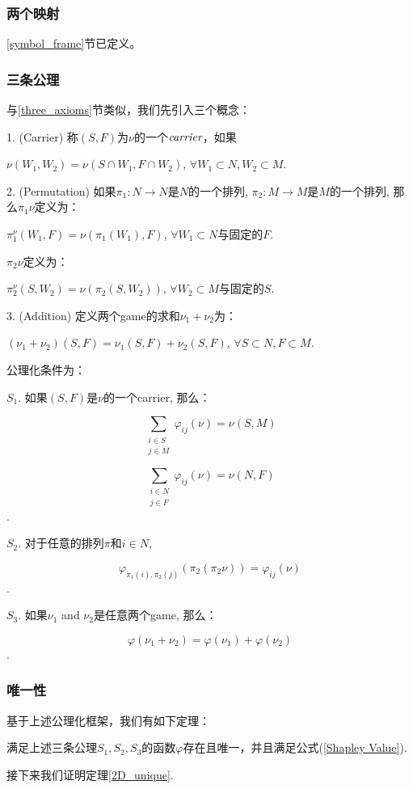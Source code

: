 \subsubsection{两个映射}
\ref{symbol_frame}节已定义。

\subsubsection{三条公理}
与\ref{three_axioms}节类似，我们先引入三个概念：

1. (Carrier) 称$(S,F)$为$\nu$的一个$\emph{carrier}$，如果

$\nu(W_1, W_2)=\nu(S\cap W_1, F\cap W_2)$,  $\forall W_1 \subset N, W_2 \subset M$. 


2. (Permutation) 如果$\pi_1: N\rightarrow N$是$N$的一个排列, $\pi_2: M\rightarrow M$是$M$的一个排列, 那么$\pi_1\nu$定义为：

$\pi_1^\nu(W_1, F) = \nu(\pi_1(W_1), F)$, $\forall W_1 \subset N$与固定的$F$.

$\pi_2\nu$定义为： 

$\pi_2^\nu(S, W_2) = \nu(\pi_2(S, W_2))$, $\forall W_2 \subset M$与固定的$S$.

3. (Addition) 定义两个game的求和$\nu_1+\nu_2$为：

$(\nu_1+\nu_2)(S, F) = \nu_1(S, F)+\nu_2(S, F)$, $\forall S \subset N, F \subset M$.

公理化条件为：

$S_1$. 如果$(S,F)$是$\nu$的一个carrier, 那么： 

$$\sum_{\substack{i \in S\\j \in M}} \varphi_{ij}(\nu) = \nu(S, M)$$

$$\sum_{\substack{i \in N\\j \in F}} \varphi_{ij}(\nu) = \nu(N, F)$$.


$S_2$. 对于任意的排列$\pi$和$i \in N$,

$$\varphi_{\pi_1(i), \pi_2(j)}(\pi_2(\pi_2\nu)) = \varphi_{ij}(\nu)$$.

$S_3$. 如果$\nu_1$ and $\nu_2$是任意两个game, 那么：

$$\varphi(\nu_1+\nu_2) = \varphi(\nu_1)+\varphi(\nu_2)$$.

\subsubsection{唯一性}
基于上述公理化框架，我们有如下定理：
\begin{theorem}
	满足上述三条公理$S_1, S_2, S_3$的函数$\varphi$存在且唯一，并且满足公式(\ref{Shapley Value}).
	\label{2D_unique}
\end{theorem}
接下来我们证明定理\ref{2D_unique}.

